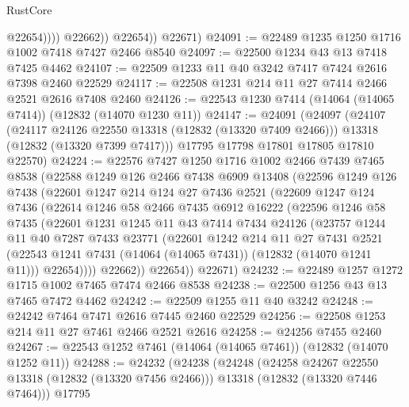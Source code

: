 \begin{lexlean}{RustCore}
\begin{coremodule}
                      @22654))))
              @22662))
          @22654))
      @22671)
@24091 := @22489 @1235 @1250 @1716 @1002 @7418 @7427 @2466 @8540
@24097 := @22500 @1234 @43 @13 @7418 @7425 @4462
@24107 := @22509 @1233 @11 @40 @3242 @7417 @7424 @2616 @7398 @2460 @22529
@24117 := @22508 @1231 @214 @11 @27 @7414 @2466 @2521 @2616 @7408 @2460
@24126 := @22543 @1230 @7414 (@14064 (@14065 @7414)) (@12832 (@14070 @1230 @11))
@24147 := @24091
    (@24097
      (@24107
        (@24117 @24126 @22550 @13318 (@12832 (@13320 @7409 @2466)))
        @13318
        (@12832 (@13320 @7399 @7417)))
      @17795
      @17798
      @17801
      @17805
      @17810
      @22570)
@24224 := @22576
    @7427
    @1250
    @1716
    @1002
    @2466
    @7439
    @7465
    @8538
    (@22588
      @1249
      @126
      @2466
      @7438
      @6909
      @13408
      (@22596
        @1249
        @126
        @7438
        (@22601
          @1247
          @214
          @124
          @27
          @7436
          @2521
          (@22609
            @1247
            @124
            @7436
            (@22614
              @1246
              @58
              @2466
              @7435
              @6912
              @16222
              (@22596
                @1246
                @58
                @7435
                (@22601
                  @1231
                  @1245
                  @11
                  @43
                  @7414
                  @7434
                  @24126
                  (@23757
                    @1244
                    @11
                    @40
                    @7287
                    @7433
                    @23771
                    (@22601
                      @1242
                      @214
                      @11
                      @27
                      @7431
                      @2521
                      (@22543 @1241 @7431 (@14064 (@14065 @7431)) (@12832 (@14070 @1241 @11)))
                      @22654))))
              @22662))
          @22654))
      @22671)
@24232 := @22489 @1257 @1272 @1715 @1002 @7465 @7474 @2466 @8538
@24238 := @22500 @1256 @43 @13 @7465 @7472 @4462
@24242 := @22509 @1255 @11 @40 @3242
@24248 := @24242 @7464 @7471 @2616 @7445 @2460 @22529
@24256 := @22508 @1253 @214 @11 @27 @7461 @2466 @2521 @2616
@24258 := @24256 @7455 @2460
@24267 := @22543 @1252 @7461 (@14064 (@14065 @7461)) (@12832 (@14070 @1252 @11))
@24288 := @24232
    (@24238
      (@24248
        (@24258 @24267 @22550 @13318 (@12832 (@13320 @7456 @2466)))
        @13318
        (@12832 (@13320 @7446 @7464)))
      @17795

\end{coremodule}
\end{lexlean}
